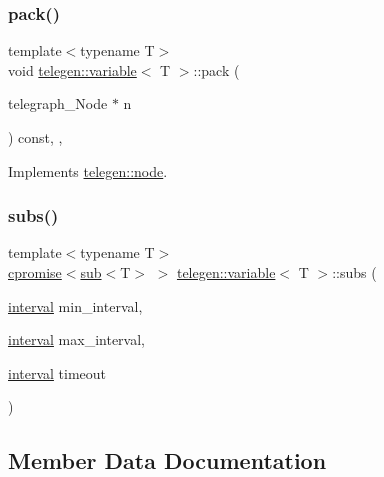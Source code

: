 \subsubsection{\texorpdfstring{pack()}{pack()}\hspace{0.1cm}{\footnotesize\ttfamily [2/2]}}
{\footnotesize\ttfamily template$<$typename T$>$ \\
void \hyperlink{classtelegen_1_1variable}{telegen\+::variable}$<$ T $>$\+::pack (\begin{DoxyParamCaption}\item[{telegraph\+\_\+\+Node $\ast$}]{n }\end{DoxyParamCaption}) const\hspace{0.3cm}{\ttfamily [inline]}, {\ttfamily [override]}, {\ttfamily [virtual]}}



Implements \hyperlink{classtelegen_1_1node_a8b6169d62f6e7c2e301435e52442fed3}{telegen\+::node}.

\mbox{\label{classtelegen_1_1variable_aa742bfaf515df28d57e50ac0dd821ac2}} 
\subsubsection{\texorpdfstring{subs()}{subs()}}
{\footnotesize\ttfamily template$<$typename T$>$ \\
\hyperlink{namespacetelegen_a73ca2c44e7e302c2405f99a28e35acb7}{cpromise}$<$\hyperlink{classtelegen_1_1sub}{sub}$<$T$>$ $>$ \hyperlink{classtelegen_1_1variable}{telegen\+::variable}$<$ T $>$\+::subs (\begin{DoxyParamCaption}\item[{\hyperlink{namespacetelegen_ad925de2d0a99bc43918533abf0457344}{interval}}]{min\+\_\+interval,  }\item[{\hyperlink{namespacetelegen_ad925de2d0a99bc43918533abf0457344}{interval}}]{max\+\_\+interval,  }\item[{\hyperlink{namespacetelegen_ad925de2d0a99bc43918533abf0457344}{interval}}]{timeout }\end{DoxyParamCaption})\hspace{0.3cm}{\ttfamily [inline]}}



\subsection{Member Data Documentation}
\mbox{\label{classtelegen_1_1variable_ac67a18e28f7fde8cf9e86e97d4cc3ece}} 
